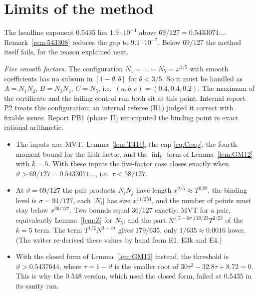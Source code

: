 \documentclass[11pt]{amsart}
\theoremstyle{definition}
\theoremstyle{remark}
\begin{document}
\section{Limits of the method}\label{sec:limits}

The headline exponent $0.5435$ lies $1.9\cdot10^{-4}$ above $69/127=0.5433071\ldots$. Remark~\ref{rem:543308} reduces the gap to
$9.1\cdot10^{-7}$. Below $69/127$ the method itself fails, for the reason explained next.

\emph{Five smooth factors.} The configuration $N_1=\dots=N_5=x^{1/5}$ with smooth coefficients has no subsum in $[1-\theta,\theta]$
for $\theta<3/5$. So it must be handled as $A=N_1N_2$, $B=N_3N_4$, $C=N_5$, i.e.\ $(a,b,c)=(0.4,0.4,0.2)$. The maximum of the certificate and the
failing control run both sit at this point. Internal report P2 treats this configuration; an internal referee (R1) judged it correct with
fixable issues. Report PB1 (phase~II) recomputed the binding point in exact rational arithmetic.
\begin{itemize}[leftmargin=*]
\item The inputs are: MVT, Lemma~\ref{lem:T411}, the cap \eqref{eq:Ccap}, the fourth-moment bound for the fifth factor, and the $\inf_k$ form of Lemma~\ref{lem:GM12} with $k=5$.
With these inputs the five-factor case closes exactly when $\vartheta>69/127=0.5433071\ldots$, i.e.\ $\tau<58/127$.
\item At $\vartheta=69/127$ the pair products $N_iN_j$ have length $x^{2/5}\approx T^{0.88}$, the binding level is $\sigma=91/127$, each
$|N_i|$ has size $x^{11/254}$, and the number of points must stay below $x^{36/127}$. Two bounds equal $36/127$ exactly: MVT for a pair,
equivalently Lemma~\ref{lem:Z} for $N_5$; and the part $N^{(5-6\sigma)20/23}T^{2/23}$ of the $k=5$ term. The term $T^{1/2}N^{3-4\sigma}$ gives $179/635$,
only $1/635\approx0.0016$ lower. (The writer re-derived these values by hand from E1, E3k and E4.)
\item With the closed form of Lemma~\ref{lem:GM12} instead, the threshold is $\vartheta>0.5437644$, where $\tau=1-\vartheta$ is the smaller root of
$30\tau^2-32.8\tau+8.72=0$. This is why the $0.548$ version, which used the closed form, failed at $0.5435$ in its sanity run.
\end{itemize}
\end{document}
